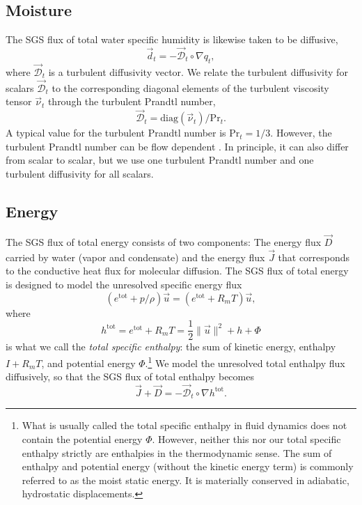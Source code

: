 \documentclass{report}
\begin{document}
\subsection{Moisture}

The SGS flux of total water specific humidity is likewise taken to be diffusive,
\begin{equation}\label{eq:sgs-shum-flux}
\vec{d}_{t} = - \vec{\mathcal{D}}_t \circ \nabla q_t,
\end{equation}
where $\vec{\mathcal{D}}_t$ is a turbulent diffusivity vector. We relate the turbulent diffusivity for scalars $\vec{\mathcal{D}}_t$ to the corresponding diagonal elements of the turbulent viscosity tensor $\vec{\nu}_t$ through the turbulent Prandtl number, 
\begin{equation}
\vec{\mathcal{D}}_t = \mathrm{diag}(\vec{\nu}_t) / \mathrm{Pr}_{t}.
\end{equation} 
A typical value for the turbulent Prandtl number is $\mathrm{Pr}_{t} = 1/3$. However, the turbulent Prandtl number can be flow dependent \citep[e.g.,][]{Deardorff80a}. In principle, it can also differ from scalar to scalar, but we use one turbulent Prandtl number and one turbulent diffusivity for all scalars. 

\subsection{Energy}

The SGS flux of total energy consists of two components: The energy flux $\vec{D}$ carried by water (vapor and condensate) and the energy flux $\vec{J}$ that corresponds to the conductive heat flux for molecular diffusion. The SGS flux of total energy is designed to model the unresolved specific energy flux 
\[
(e^{\mathrm{tot}} + p/\rho) \vec{u} = (e^{\mathrm{tot}} + R_m T) \vec{u}, 
\]
where
\[
h^{\mathrm{tot}} = e^{\mathrm{tot}} + R_m T = \frac{1}{2} \| \vec{u} \|^2 + h + \Phi
\]
is what we call the \emph{total specific enthalpy}: the sum of kinetic energy, enthalpy $I + R_m T$, and potential energy $\Phi$.\footnote{What is usually called the total specific enthalpy in fluid dynamics does not contain the potential energy $\Phi$. However, neither this nor our total specific enthalpy strictly are enthalpies in the thermodynamic sense. The sum of enthalpy and potential energy (without the kinetic energy term) is commonly referred to as the moist static energy. It is materially conserved in adiabatic, hydrostatic displacements.} We model the unresolved total enthalpy flux diffusively, so that the SGS flux of total enthalpy becomes
\begin{equation}\label{e:SGS_energy_flux}
\vec{J} + \vec{D} = - \vec{\mathcal{D}}_t \circ \nabla h^{\mathrm{tot}}.
\end{equation}
\end{document}

